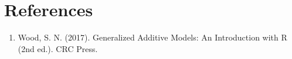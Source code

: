 \section{References}
\begin{enumerate}
\item Wood, S. N. (2017). Generalized Additive Models: An Introduction with R (2nd ed.). CRC Press.
\end{enumerate}